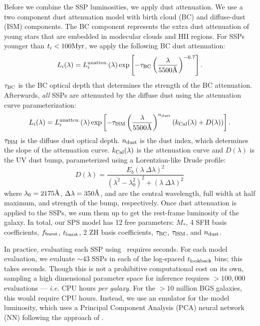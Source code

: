 Before we combine the SSP luminosities, we apply dust attenuation.
We use a two component \cite{charlot2000} dust attenuation model with birth
cloud (BC) and diffuse-dust (ISM) components. 
The BC component represents the extra dust attenuation of young stars that are
embedded in modecular clouds and HII regions. 
For SSPs younger than $t_i < 100{\rm Myr}$, we apply the
following BC dust attenuation: 
\begin{equation}
    L_i(\lambda) = L_i^{\rm unatten.}(\lambda) \exp\left[-\tau_{\rm BC} \left(
    \frac{\lambda}{5500\AA} \right)^{-0.7} \right].
\end{equation}
$\tau_{\rm BC}$ is the BC optical depth that determines the strength of the BC
attenuation. 
Afterwards, {\em all} SSPs are attenuated by the diffuse dust using the
\cite{kriek2013} attenuation curve parameterization: 
\begin{equation}
    L_i(\lambda) = L_i^{\rm unatten.}(\lambda) \exp\left[-\tau_{\rm ISM} \left(
    \frac{\lambda}{5500\AA} \right)^{n_{\rm dust}} \left(k_{\rm Cal}(\lambda) +
    D(\lambda) \right) \right].
\end{equation}
$\tau_{\rm ISM}$ is the diffuse dust optical depth.
$n_{\rm dust}$ is the \cite{calzetti2001} dust index, which determines the
slope of the attenuation curve. 
$k_{\rm Cal}(\lambda)$ is the \cite{calzetti2001} attenuation curve and
$D(\lambda)$ is the UV dust bump, parameterized using a Lorentzian-like Drude 
profile:
\begin{equation}
    D(\lambda) = \frac{E_b(\lambda~\Delta \lambda)^2}{(\lambda^2 -
    \lambda_0^2)^2 + (\lambda~\Delta \lambda)^2}
\end{equation}
where $\lambda_0 = 2175 \AA$, $\Delta \lambda = 350\AA$, and  are the
central wavelength, full width at half maximum, and strength of the bump,
respectively. 
Once dust attenuation is applied to the SSPs, we sum them up to get the
rest-frame luminosity of the galaxy. 
In total, our SPS model has 12 free parameters: $M_*$, 4 SFH basis
coefficients, $f_{\rm burst}$, $t_{\rm burst}$, 2 ZH basis coefficients,
$\tau_{\rm BC}$, $\tau_{\rm ISM}$, and $n_{\rm dust}$. 


In practice, evaluating each SSP using \fsps~requires  seconds. 
For each model evaluation, we evaluate $\sim 43$ SSPs in each of the log-spaced
$t_{\rm lookback}$ bins; this takes  seconds. 
Though this is not a prohibitive computational cost on its own, sampling a
high dimensional parameter space for inference requires $>100,000$ evaluations
--- \emph{i.e.}  CPU hours \emph{per galaxy}. 
For the $>10$ million BGS galaxies, this would require 
CPU hours. 
Instead, we use an emulator for the model luminosity, which uses a Principal
Component Analysis (PCA) neural network (NN) following the approach of
\cite{alsing2019}.

